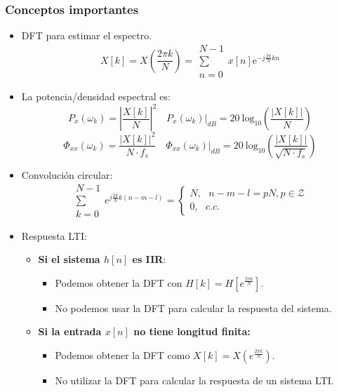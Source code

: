 \documentclass{beamer}
\numberwithin{section}{part}
\begin{document}
\begin{frame}
  \frametitle{Conceptos importantes}

  \begin{itemize}\scriptsize
    \item \alert{DFT para estimar el espectro.}
    \[
      X[k]=X(\frac{2\pi k}{N})=\substack{N-1\\\sum\\n=0}x[n]\text{e}^{-j\frac{2\pi}{N}kn}
    \]

    \item \alert{La potencia/densidad espectral es:}
    \[
      P_{x}(\omega_k)=\left|\frac{X[k]}{N}\right|^2 \quad P_{x}(\omega_k)|_{dB} = 20\:\text{log}_{10}\left(\frac{|X[k]|}{N}\right)
    \]
    \[
    \Phi_{xx}(\omega_k)=\frac{|X[k]|^2}{N\cdot f_s} \quad \Phi_{xx}(\omega_k)|_{dB} = 20\:\text{log}_{10}\left(\frac{|X[k]|}{\sqrt{N\cdot f_s}}\right)
    \]

    \item \alert{Convolución circular:}
    \[
      \substack{N-1\\\sum\\k=0}e^{j \frac{2\pi}{N}k(n-m-l)} = \left \{\begin{array}{l} N,   \:\:\: n-m-l=pN, p\in \mathcal{Z} \\ 0,  \:\:\: c.c. \end{array}\right .
    \]

    \item \alert{Respuesta LTI:}
    \begin{itemize}\scriptsize
      \item \textbf{Si el sistema $h[n]$ es IIR}:
      \begin{itemize}\scriptsize
        \item Podemos obtener la DFT con $H[k]=H[e^{\frac{2\pi k}{N}}]$. 
        \item No podemos usar la DFT para calcular la respuesta del sistema.
      \end{itemize}
      \vspace{0.2cm}
    
      \item \textbf{Si la entrada $x[n]$ no tiene longitud finita:}
      \begin{itemize}\scriptsize
        \item Podemos obtener la DFT como $X[k]=X(e^{\frac{2\pi k}{N}})$.
        \item No utilizar la DFT para calcular la respuesta de un sistema LTI.
      \end{itemize}
      \vspace{0.2cm}
    \end{itemize}
  \end{itemize}

\end{frame}
\end{document}

